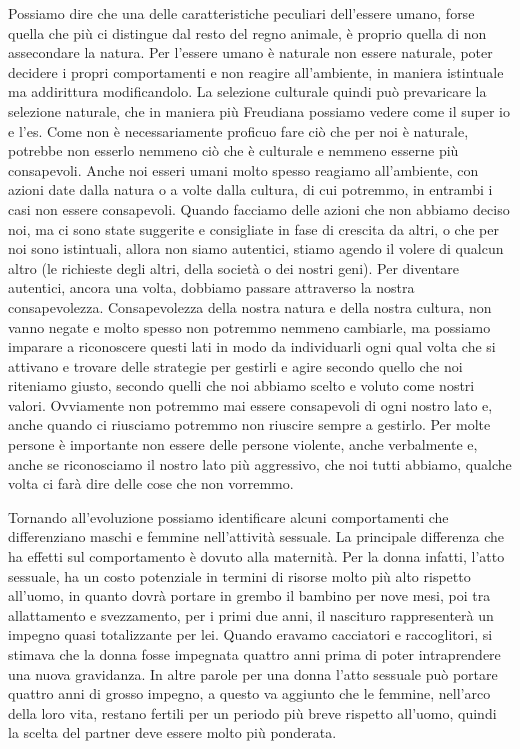 \documentclass[12pt]{book} %
\begin{document}
Possiamo dire che una delle caratteristiche peculiari dell'essere umano, forse quella che più ci
distingue dal resto del regno animale, è proprio quella di non assecondare la natura. Per l'essere
umano è naturale non essere naturale, poter decidere i propri comportamenti e non reagire
all'ambiente, in maniera istintuale ma addirittura modificandolo. La selezione culturale quindi
può prevaricare la selezione naturale, che in maniera più Freudiana possiamo vedere come il super io e
l'es. Come non è necessariamente proficuo fare ciò che per noi è naturale, potrebbe non esserlo
nemmeno ciò che è culturale e nemmeno esserne più consapevoli. Anche noi esseri umani molto spesso reagiamo
all'ambiente, con azioni date dalla natura o a volte dalla cultura, di cui potremmo, in entrambi i
casi non essere consapevoli. Quando facciamo delle azioni che non abbiamo deciso noi, ma ci sono state suggerite e
consigliate in fase di crescita da altri, o che per noi sono istintuali, allora non siamo autentici, stiamo agendo il
volere di qualcun altro (le richieste degli altri, della società o dei nostri geni). Per diventare autentici, ancora
una volta, dobbiamo passare attraverso la nostra consapevolezza. Consapevolezza della nostra natura e della nostra
cultura, non vanno negate e molto spesso non potremmo nemmeno cambiarle, ma possiamo imparare a riconoscere questi lati
in modo da individuarli ogni qual volta che si attivano e trovare delle strategie per gestirli e agire secondo quello
che noi riteniamo giusto, secondo quelli che noi abbiamo scelto e voluto come nostri valori. Ovviamente non potremmo
mai essere consapevoli di ogni nostro lato e, anche quando ci riusciamo potremmo non riuscire sempre a gestirlo. Per
molte persone è importante non essere delle persone violente, anche verbalmente e, anche se riconosciamo il nostro lato
più aggressivo, che noi tutti abbiamo, qualche volta ci farà dire delle cose che non vorremmo.

Tornando all'evoluzione possiamo identificare alcuni comportamenti che differenziano maschi e
femmine nell'attività sessuale. La principale differenza che ha effetti sul comportamento è dovuto
alla maternità. Per la donna infatti, l'atto sessuale, ha un costo potenziale in termini di
risorse molto più alto rispetto all'uomo, in quanto dovrà portare in grembo il bambino per nove
mesi, poi tra allattamento e svezzamento, per i primi due anni, il nascituro rappresenterà un impegno quasi
totalizzante per lei. Quando eravamo cacciatori e raccoglitori, si stimava che la donna fosse impegnata quattro anni
prima di poter intraprendere una nuova gravidanza. In altre parole per una donna l'atto sessuale
può portare quattro anni di grosso impegno, a questo va aggiunto che le femmine, nell'arco della
loro vita, restano fertili per un periodo più breve rispetto all'uomo, quindi la scelta del
partner deve essere molto più ponderata.
\end{document}
